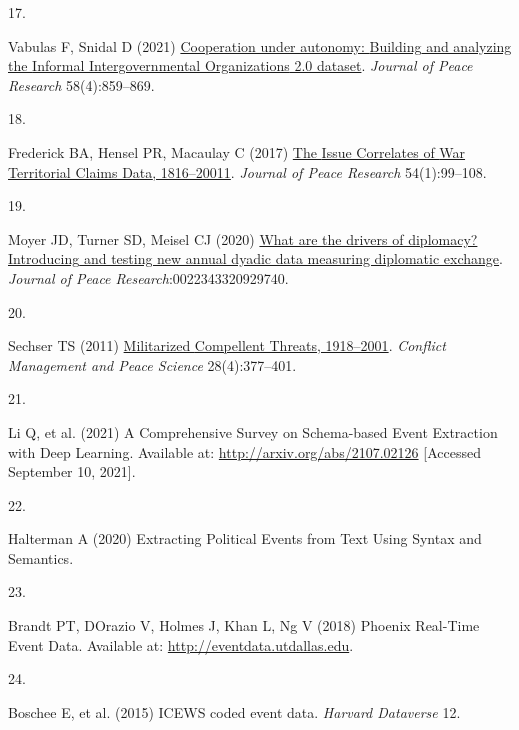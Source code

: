 \documentclass[9pt,twocolumn,twoside,lineno]{pnas-new}
\newlength{\cslhangindent}
\newlength{\csllabelwidth}
\newlength{\cslentryspacingunit} %
\newenvironment{CSLReferences}[2] %
 {%
  \setlength{\parindent}{0pt}
  \ifodd #1
  \let\oldpar\par
  \def\par{\hangindent=\cslhangindent\oldpar}
  \fi
  \setlength{\parskip}{#2\cslentryspacingunit}
 }%
 {}
\newcommand{\CSLLeftMargin}[1]{\parbox[t]{\csllabelwidth}{#1}}
\newcommand{\CSLRightInline}[1]{\parbox[t]{\linewidth - \csllabelwidth}{#1}\break}
\begin{document}
\begin{CSLReferences}{0}{0}
\leavevmode{}%
\CSLLeftMargin{17. }%
\CSLRightInline{Vabulas F, Snidal D (2021)
\href{https://doi.org/10.1177/0022343320943920}{Cooperation under
autonomy: {Building} and analyzing the {Informal Intergovernmental
Organizations} 2.0 dataset}. \emph{Journal of Peace Research}
58(4):859--869.}

\leavevmode{}%
\CSLLeftMargin{18. }%
\CSLRightInline{Frederick BA, Hensel PR, Macaulay C (2017)
\href{https://doi.org/10.1177/0022343316676311}{The {Issue Correlates}
of {War Territorial Claims Data}, 1816--20011}. \emph{Journal of Peace
Research} 54(1):99--108.}

\leavevmode{}%
\CSLLeftMargin{19. }%
\CSLRightInline{Moyer JD, Turner SD, Meisel CJ (2020)
\href{https://doi.org/10.1177/0022343320929740}{What are the drivers of
diplomacy? {Introducing} and testing new annual dyadic data measuring
diplomatic exchange}. \emph{Journal of Peace
Research}:0022343320929740.}

\leavevmode{}%
\CSLLeftMargin{20. }%
\CSLRightInline{Sechser TS (2011)
\href{https://doi.org/10.1177/0738894211413066}{Militarized {Compellent
Threats}, 1918--2001}. \emph{Conflict Management and Peace Science}
28(4):377--401.}

\leavevmode{}%
\CSLLeftMargin{21. }%
\CSLRightInline{Li Q, et al. (2021) A {Comprehensive Survey} on
{Schema-based Event Extraction} with {Deep Learning}. Available at:
\url{http://arxiv.org/abs/2107.02126} {[}Accessed September 10,
2021{]}.}

\leavevmode{}%
\CSLLeftMargin{22. }%
\CSLRightInline{Halterman A (2020) Extracting {Political Events} from
{Text Using Syntax} and {Semantics}.}

\leavevmode{}%
\CSLLeftMargin{23. }%
\CSLRightInline{Brandt PT, DOrazio V, Holmes J, Khan L, Ng V (2018)
Phoenix {Real-Time Event Data}. Available at:
\url{http://eventdata.utdallas.edu}.}

\leavevmode{}%
\CSLLeftMargin{24. }%
\CSLRightInline{Boschee E, et al. (2015) {ICEWS} coded event data.
\emph{Harvard Dataverse} 12.}


\end{CSLReferences}
\end{document}
